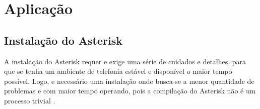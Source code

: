 
\chapter{Aplicação} %
\section{Instalação do Asterisk}
A instalação do Asterisk requer e exige uma série de cuidados e detalhes,  para que se tenha um ambiente de telefonia estável e disponível o maior tempo possível. Logo, e necessário uma instalação onde busca-se a menor quantidade de problemas e com maior tempo operando, pois a compilação do Asterisk não é um processo trivial \cite{alexandrekeller2014}.